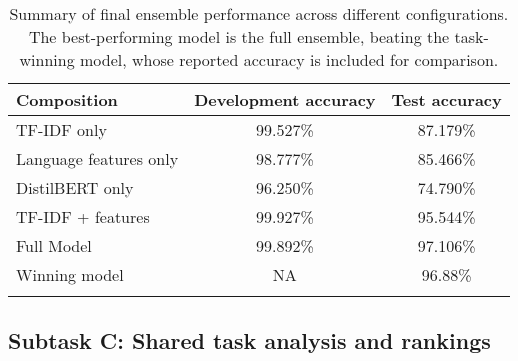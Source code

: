 \begin{table}[ht]
    \vspace{0.1cm}
    \centering
    \begin{tabular}{lcc}
        \toprule
        Composition            & Development accuracy & Test accuracy \\

        \midrule
        TF-IDF only            & 99.527\%             & 87.179\%      \\
        Language features only & 98.777\%             & 85.466\%      \\
        DistilBERT only        & 96.250\%             & 74.790\%      \\
        TF-IDF + features      & 99.927\%             & 95.544\%      \\
        Full Model             & 99.892\%             & 97.106\%      \\
        \midrule
        Winning model          & NA                   & 96.88\%       \\
        \bottomrule
        \vspace{0.1cm}
    \end{tabular}
    \caption{
        Summary of final ensemble performance across different configurations.
        The best-performing model is the full ensemble, beating the task-winning model, whose reported accuracy is included for comparison.
    }
    \label{tab:ensemble-final}
\end{table}

\subsection{Subtask C: Shared task analysis and rankings}
